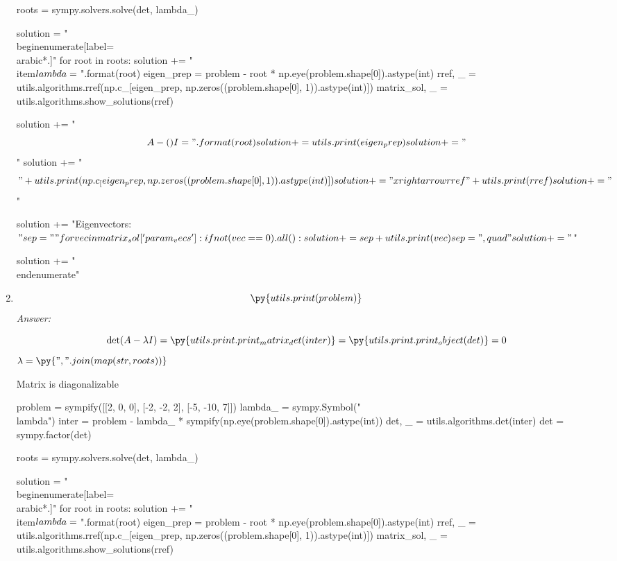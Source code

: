 \documentclass[letterpaper]{article}
\newcommand{\ans}{\textit{Answer: }}
\newenvironment{question}[2][Question]{\begin{trivlist}
\item[\hskip \labelsep {\bfseries #1}\hskip \labelsep {\bfseries #2.}]}{\end{trivlist}}
\newcommand{\printobj}[1]{\py{utils.print.print_object(#1)}}
\begin{document}
\begin{question}{5.5}
\begin{enumerate}[label=\textbf{(\alph*)}]
\begin{pycode}
roots = sympy.solvers.solve(det, lambda_)

solution = "\\begin{enumerate}[label=\\arabic*.]\n"
for root in roots:
  solution += "\\item$\\lambda = {}$\n".format(root)
  eigen_prep = problem - root * np.eye(problem.shape[0]).astype(int)
  rref, _ = utils.algorithms.rref(np.c_[eigen_prep, np.zeros((problem.shape[0], 1)).astype(int)])
  matrix_sol, _ = utils.algorithms.show_solutions(rref)

  solution += "$$A - ({}) I = ".format(root)
  solution += utils.print(eigen_prep)
  solution += "$$\n"
  solution += "$$" + utils.print(np.c_[eigen_prep, np.zeros((problem.shape[0], 1)).astype(int)])
  solution += "\\xrightarrow{rref}" + utils.print(rref)
  solution += "$$\n"

  solution += "Eigenvectors: $"

  sep = ""
  for vec in matrix_sol['param_vecs']:
    if not (vec == 0).all():
      solution += sep + utils.print(vec)
      sep = ",\\quad"

  solution += "$\n"

solution += "\\end{enumerate}"

    \end{pycode}

    \item $$\py{utils.print(problem)}$$
    \ans

    $$\det(A - \lambda I) = \py{utils.print.print_matrix_det(inter)} = \printobj{det} = 0$$
    $\lambda = \py{", ".join(map(str, roots))}$


    Matrix is diagonalizable
    \begin{pycode}
problem = sympify([[2, 0, 0], [-2, -2, 2], [-5, -10, 7]])
lambda_ = sympy.Symbol("\\lambda")
inter = problem - lambda_ * sympify(np.eye(problem.shape[0]).astype(int))
det, _ = utils.algorithms.det(inter)
det = sympy.factor(det)

roots = sympy.solvers.solve(det, lambda_)

solution = "\\begin{enumerate}[label=\\arabic*.]\n"
for root in roots:
  solution += "\\item$\\lambda = {}$\n".format(root)
  eigen_prep = problem - root * np.eye(problem.shape[0]).astype(int)
  rref, _ = utils.algorithms.rref(np.c_[eigen_prep, np.zeros((problem.shape[0], 1)).astype(int)])
  matrix_sol, _ = utils.algorithms.show_solutions(rref)


\end{pycode}
\end{enumerate}
\end{question}
\end{document}
